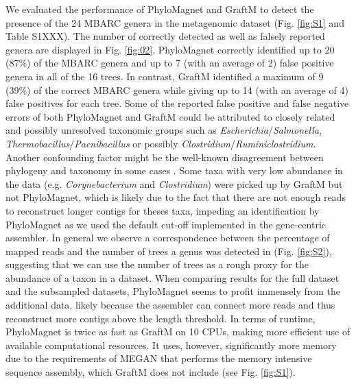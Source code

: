 \documentclass{bioinfo}
\begin{document}
We evaluated the performance of PhyloMagnet and GraftM to detect the presence of the 24 MBARC genera \citep[23 of those detectable, as Nocardiopsis was part of the pooled community but not present in the sequence data from][]{Singer2016} in the metagenomic dataset (Fig. \ref{fig:S1} and Table S1XXX). The number of correctly detected as well as falsely reported genera are displayed in Fig. \ref{fig:02}. PhyloMagnet correctly identified up to 20 (87\%) of the MBARC genera and up to 7 (with an average of 2) false positive genera in all of the 16 trees. In contrast, GraftM identified a maximum of 9 (39\%) of the correct MBARC genera while giving up to 14 (with an average of 4) false positives for each tree. Some of the reported false positive and false negative errors of both PhyloMagnet and GraftM could be attributed to closely related and possibly unresolved taxonomic groups such as \textit{Escherichia}/\textit{Salmonella}, \textit{Thermobacillus}/\textit{Paenibacillus} or possibly \textit{Clostridium}/\textit{Ruminiclostridium}. Another confounding factor might be the well-known disagreement between phylogeny and taxonomy in some cases \citep[e.g. \textit{Escherichia}/\textit{Salmonella};][]{Retchless2010}.  Some taxa with very low abundance in the data (e.g. \textit{Corynebacterium} and \textit{Clostridium}) were picked up by GraftM but not PhyloMagnet, which is likely due to the fact that there are not enough reads to reconstruct longer contigs for theses taxa, impeding an identification by PhyloMagnet as we used the default cut-off implemented in the gene-centric assembler. In general we observe a correspondence between the percentage of mapped reads \citep{Singer2016} and the number of trees a genus was detected in (Fig. \ref{fig:S2}), suggesting that we can use the number of trees as a rough proxy for the abundance of a taxon in a dataset.  
When comparing results for the full dataset and the subsampled datasets, PhyloMagnet seems to profit immensely from the additional data, likely because the assembler can connect more reads and thus reconstruct more contigs above the length threshold.
In terms of runtime, PhyloMagnet is twice as fast as GraftM on 10 CPUs, making more efficient use of available computational resources. It uses, however, significantly more memory due to the requirements of MEGAN that performs the memory intensive sequence assembly, which GraftM does not include (see Fig. \ref{fig:S1}).
\end{document}
